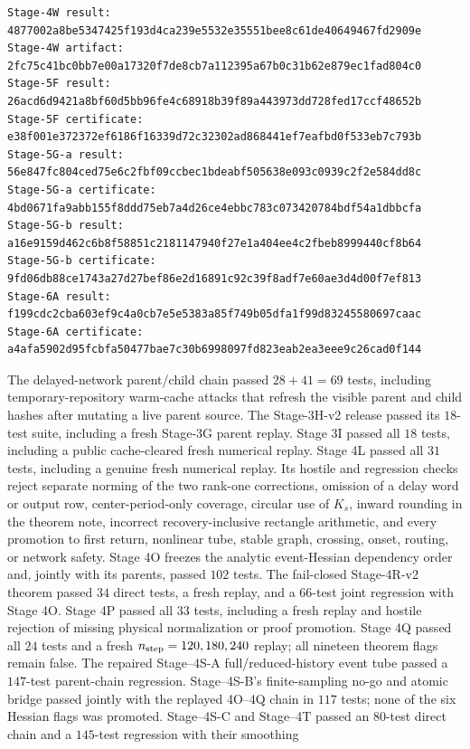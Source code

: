 \begin{verbatim}
Stage-4W result:
4877002a8be5347425f193d4ca239e5532e35551bee8c61de40649467fd2909e
Stage-4W artifact:
2fc75c41bc0bb7e00a17320f7de8cb7a112395a67b0c31b62e879ec1fad804c0
Stage-5F result:
26acd6d9421a8bf60d5bb96fe4c68918b39f89a443973dd728fed17ccf48652b
Stage-5F certificate:
e38f001e372372ef6186f16339d72c32302ad868441ef7eafbd0f533eb7c793b
Stage-5G-a result:
56e847fc804ced75e6c2fbf09ccbec1bdeabf505638e093c0939c2f2e584dd8c
Stage-5G-a certificate:
4bd0671fa9abb155f8ddd75eb7a4d26ce4ebbc783c073420784bdf54a1dbbcfa
Stage-5G-b result:
a16e9159d462c6b8f58851c2181147940f27e1a404ee4c2fbeb8999440cf8b64
Stage-5G-b certificate:
9fd06db88ce1743a27d27bef86e2d16891c92c39f8adf7e60ae3d4d00f7ef813
Stage-6A result:
f199cdc2cba603ef9c4a0cb7e5e5383a85f749b05dfa1f99d83245580697caac
Stage-6A certificate:
a4afa5902d95fcbfa50477bae7c30b6998097fd823eab2ea3eee9c26cad0f144
\end{verbatim}
The delayed-network parent/child chain passed \(28+41=69\) tests, including
temporary-repository warm-cache attacks that refresh the visible parent and
child hashes after mutating a live parent source.  The Stage-3H-v2 release
passed its \(18\)-test suite, including a fresh Stage-3G parent replay.
Stage 3I passed all \(18\) tests, including a public cache-cleared fresh
numerical replay.  Stage 4L passed all \(31\) tests, including a genuine fresh
numerical replay.  Its hostile and regression checks reject separate norming
of the two rank-one corrections, omission of a delay word or output row,
center-period-only coverage, circular use of \(K_s\), inward rounding in the
theorem note, incorrect recovery-inclusive rectangle arithmetic, and every
promotion to first return, nonlinear tube, stable graph, crossing, onset,
routing, or network safety.  Stage 4O freezes the analytic event-Hessian
dependency order and, jointly with its parents, passed \(102\) tests.  The
fail-closed Stage-4R-v2 theorem passed \(34\) direct tests, a fresh replay,
and a \(66\)-test joint regression with Stage 4O.  Stage 4P passed all \(33\) tests,
including a fresh replay and hostile rejection of missing physical
normalization or proof promotion.  Stage 4Q passed all \(24\) tests and a
fresh \(n_{\rm step}=120,180,240\) replay; all nineteen theorem flags remain
false.  The repaired Stage--4S-A full/reduced-history event tube passed a
\(147\)-test parent-chain regression.  Stage--4S-B's finite-sampling no-go and
atomic bridge passed jointly with the replayed 4O--4Q chain in \(117\) tests;
none of the six Hessian flags was promoted.  Stage--4S-C and Stage--4T passed
an \(80\)-test direct chain and a \(145\)-test regression with their smoothing
